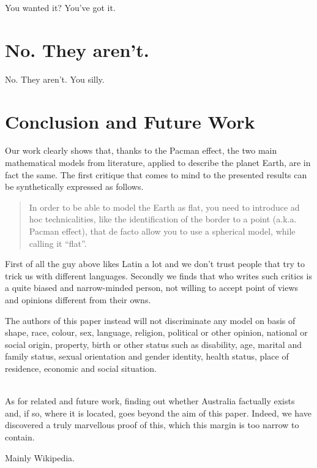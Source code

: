 \documentclass{article}
\begin{document}

You wanted it? You've got it.


\section{No. They aren't.}
No. They aren't. You silly.

\section{Conclusion and Future Work}

Our work clearly shows that, thanks to the Pacman effect, the two main mathematical models from literature, applied to describe the planet Earth, are in fact the same. %
The first critique that comes to mind to the presented results can be synthetically expressed as follows.

\begin{quote}
In order to be able to model the Earth as flat, you need to introduce ad hoc technicalities, like the identification of the border to a point (a.k.a. Pacman effect), that de facto allow you to use a spherical model, while calling it ``flat''.
\end{quote}

First of all the guy above likes Latin a lot and we don't trust people that try to trick us with different languages. Secondly we finds that who writes such critics is a quite biased and narrow-minded person, not willing to accept point of views and opinions different from their owns.

The authors of this paper instead will not discriminate any model on basis of shape, race, colour, sex, language, religion, political or other opinion, national or social origin, property, birth or other status such as disability, age, marital and family status, sexual orientation and gender identity, health status, place of residence, economic and social situation.

\ \\

As for related and future work, finding out whether Australia factually exists and, if so, where it is located, goes beyond the aim of this paper. Indeed, we have discovered a truly marvellous proof of this, which this margin is too narrow to contain.



\begin{thebibliography}{1}

  Mainly Wikipedia.

\end{thebibliography}
\end{document}
